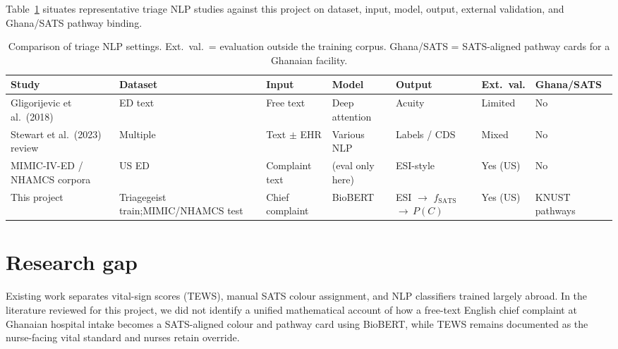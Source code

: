 Table~\ref{tab:triage-nlp-compare} situates representative triage NLP studies against this project on dataset, input, model, output, external validation, and Ghana/SATS pathway binding.

\begin{table}[H]
\centering
\footnotesize
\begin{tabularx}{\textwidth}{%
  |>{\raggedright\arraybackslash}p{2.05cm}%
  |>{\raggedright\arraybackslash}X%
  |>{\raggedright\arraybackslash}p{1.45cm}%
  |>{\raggedright\arraybackslash}p{1.55cm}%
  |>{\raggedright\arraybackslash}X%
  |>{\centering\arraybackslash}p{1.15cm}%
  |>{\raggedright\arraybackslash}p{1.35cm}|}
\hline
\textbf{Study} & \textbf{Dataset} & \textbf{Input} & \textbf{Model} & \textbf{Output} & \textbf{Ext.\ val.} & \textbf{Ghana/}\newline\textbf{SATS} \\
\hline
Gligorijevic et al.\ (2018) & ED text & Free text & Deep attention & Acuity & Limited & No \\
Stewart et al.\ (2023) review & Multiple & Text \(\pm\) EHR & Various NLP & Labels / CDS & Mixed & No \\
MIMIC-IV-ED / NHAMCS corpora & US ED & Complaint text & (eval only here) & ESI-style & Yes (US) & No \\
This project &
  Triagegeist train;\newline MIMIC/\newline NHAMCS test &
  Chief complaint &
  BioBERT &
  ESI \(\to\) \(f_{\mathrm{SATS}}\)\newline \(\to\,P(C)\) &
  Yes (US) &
  KNUST pathways \\
\hline
\end{tabularx}
\caption{Comparison of triage NLP settings. Ext.\ val.\ = evaluation outside the training corpus. Ghana/SATS = SATS-aligned pathway cards for a Ghanaian facility.}
\label{tab:triage-nlp-compare}
\end{table}

\section{Research gap}

Existing work separates vital-sign scores (TEWS), manual SATS colour assignment, and NLP classifiers trained largely abroad. In the literature reviewed for this project, we did not identify a unified mathematical account of how a free-text English chief complaint at Ghanaian hospital intake becomes a SATS-aligned colour and pathway card using BioBERT, while TEWS remains documented as the nurse-facing vital standard and nurses retain override.

